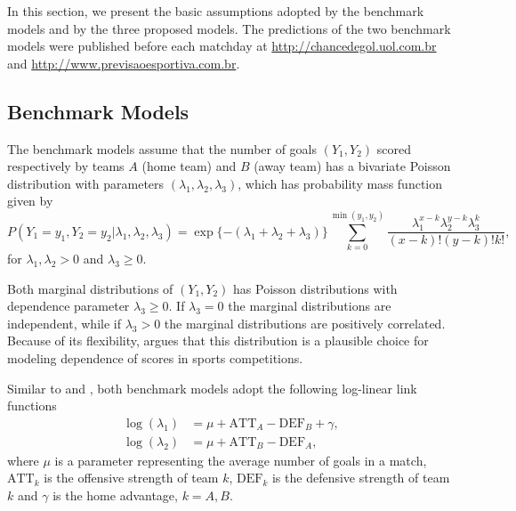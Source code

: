\documentclass[journal,article,accept,moreauthors,pdftex,12pt,a4paper]{mdpi}
\begin{document}
	In this section, we present the basic assumptions adopted by the benchmark models and
	by the three proposed models. The predictions of the
	two benchmark models were published before each matchday at
	\url{http://chancedegol.uol.com.br} and
	\url{http://www.previsaoesportiva.com.br}.
	
	\subsection{Benchmark Models}
	\label{sec::Benchmark}
	
	The benchmark models assume that the number of goals $(Y_1, Y_2)$ scored respectively by teams $A$ (home team) and $B$ (away
	team) has a bivariate Poisson distribution \citep{Holgate64} with parameters $(\lambda_1, \lambda_2, \lambda_3)$,
	which has probability mass function given by
	\begin{equation*}
	P(Y_1 = y_1, Y_2 = y_2 | \lambda_1, \lambda_2, \lambda_3) =
	\exp\{-(\lambda_1 + \lambda_2 + \lambda_3)\}
	\sum_{k = 0}^{\min(y_1, y_2)} \dfrac{\lambda_1^{x - k} \lambda_2^{y - k} \lambda_3^k}{(x-k)!(y -
		k)!k!}, \label{eq::pois.biv}
	\end{equation*}
	for $\lambda_1, \lambda_2 > 0$ and $\lambda_3 \geq 0$.
	
	Both marginal distributions of $(Y_1, Y_2)$ has Poisson
	distributions with dependence parameter $\lambda_3 \geq 0$. If
	$\lambda_3 = 0$ the marginal distributions are independent, while if
	$\lambda_3 > 0$ the marginal distributions are positively
	correlated. Because of its flexibility, \cite{Karlis2003} argues
	that this distribution is a plausible choice for modeling dependence
	of scores in sports competitions.
	
	
	Similar to \cite{Lee97} and \cite{Karlis2003}, both benchmark models
	adopt the following log-linear link functions
	\begin{align*}
	\log(\lambda_1) &= \mu + \text{ATT}_A - \text{DEF}_B + \gamma, \\
	\log(\lambda_2) &= \mu + \text{ATT}_B - \text{DEF}_A,
	\end{align*}
	where $\mu$ is a parameter representing the average number of goals
	in a match, $\text{ATT}_k$ is the offensive strength of team $k$,
	$\text{DEF}_k$ is the defensive strength of team $k$ and $\gamma$ is
	the home advantage, $k = A, B$.
	
\end{document}

